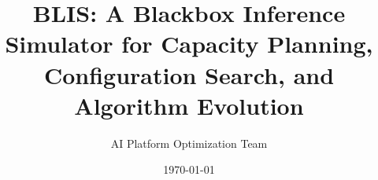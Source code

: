 \documentclass[11pt]{article}
\title{BLIS: A Blackbox Inference Simulator for Capacity Planning,\\
Configuration Search, and Algorithm Evolution}
\author{AI Platform Optimization Team}
\date{\today}
\theoremstyle{plain} %
\theoremstyle{definition} %
\theoremstyle{remark} %
\numberwithin{equation}{section}
\begin{document}
\maketitle

\begin{abstract}




\end{abstract}


\end{document}
